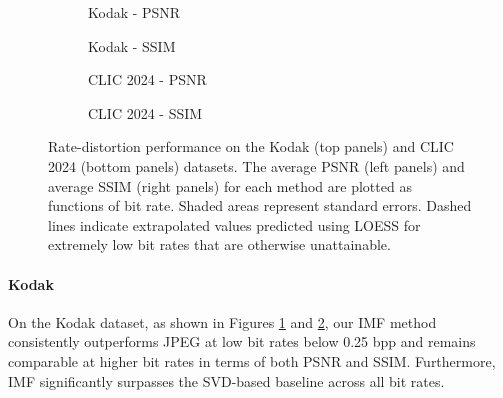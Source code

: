 \begin{figure*}[!t]
    \centering
    \begin{subfigure}[t]{0.5\textwidth}
        \centering
        \resizebox{.9\textwidth}{!}{}
        \caption{Kodak - PSNR}
        \label{fig:kodak_psnr}
    \end{subfigure}%
    \begin{subfigure}[t]{0.5\textwidth}
        \centering
        \resizebox{.9\textwidth}{!}{}
        \caption{Kodak - SSIM}
        \label{fig:kodak_ssim}
    \end{subfigure}

    \bigskip

    \begin{subfigure}[t]{.5\textwidth}
        \centering
        \resizebox{.9\textwidth}{!}{}
        \caption{CLIC 2024 - PSNR}
        \label{fig:clic_psnr}
    \end{subfigure}%
    \begin{subfigure}[t]{.5\textwidth}
        \centering
        \resizebox{.9\textwidth}{!}{}
        \caption{CLIC 2024 - SSIM}
        \label{fig:clic_ssim}
    \end{subfigure}
    \caption{Rate-distortion performance on the Kodak (top panels) and CLIC 2024 (bottom panels) datasets. The average PSNR (left panels) and average SSIM (right panels) for each method are plotted as functions of bit rate. Shaded areas represent standard errors. Dashed lines indicate extrapolated values predicted using LOESS \cite{cleveland1988locally} for extremely low bit rates that are otherwise unattainable.}
    \label{fig:rate_distortion}
\end{figure*}

\paragraph{Kodak}
On the Kodak dataset, as shown in Figures \ref{fig:kodak_psnr} and \ref{fig:kodak_ssim}, our IMF method consistently outperforms JPEG at low bit rates below 0.25 bpp and remains comparable at higher bit rates in terms of both PSNR and SSIM. Furthermore, IMF significantly surpasses the SVD-based baseline across all bit rates. 


